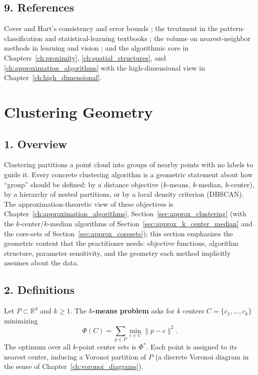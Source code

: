 \subsection{9. References}

Cover and Hart's consistency and error bounds \cite{cover1967}; the
treatment in the pattern-classification and statistical-learning textbooks
\cite{duda2001,bishop2006,hastie2009}; the volume on nearest-neighbor
methods in learning and vision \cite{shakhnarovich2006}; and the algorithmic
core in Chapters~\ref{ch:proximity}, \ref{ch:spatial_structures}, and
\ref{ch:approximation_algorithms} with the high-dimensional view in
Chapter~\ref{ch:high_dimensional}.


\section{Clustering Geometry}
\label{sec:data_ml_clustering}

\subsection{1. Overview}

Clustering partitions a point cloud into groups of nearby points with no
labels to guide it. Every concrete clustering algorithm is a geometric
statement about how ``group'' should be defined: by a distance objective
($k$-means, $k$-median, $k$-center), by a hierarchy of nested partitions, or
by a local density criterion (DBSCAN). The approximation-theoretic view of
these objectives is Chapter~\ref{ch:approximation_algorithms},
Section~\ref{sec:approx_clustering} (with the $k$-center/$k$-median
algorithms of Section~\ref{sec:approx_k_center_median} and the core-sets of
Section~\ref{sec:approx_coresets}); this section emphasizes the geometric
content that the practitioner needs: objective functions, algorithm
structure, parameter sensitivity, and the geometry each method implicitly
assumes about the data.

\subsection{2. Definitions}

\begin{definition}[$k$-Means]\label{def:data_ml_kmeans}
  Let $P \subset \mathbb{R}^d$ and $k \geq 1$. The \textbf{$k$-means
  problem} asks for $k$ centers $C = \{c_1, \dots, c_k\}$
  minimizing
  \[
    \Phi(C) = \sum_{p \in P} \min_{c \in C} \|p - c\|^2 .
  \]
  The optimum over all $k$-point center sets is $\Phi^*$. Each point is
  assigned to its nearest center, inducing a Voronoi partition of $P$ (a
  discrete Voronoi diagram in the sense of Chapter~\ref{ch:voronoi_diagrams}).
\end{definition}


